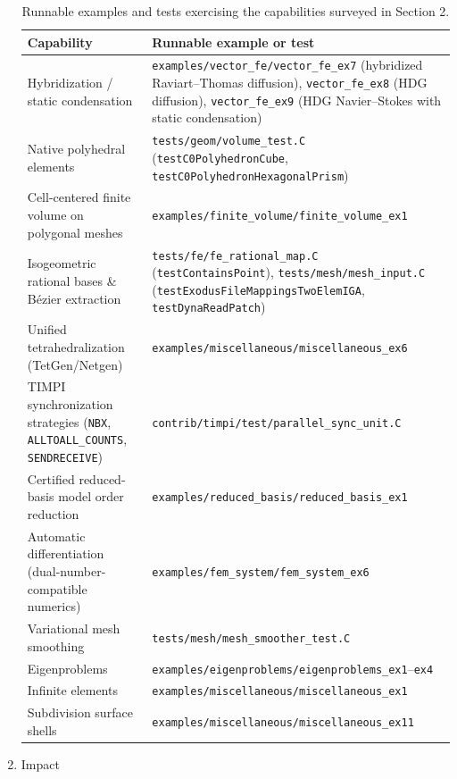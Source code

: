 \documentclass[preprint,12pt, a4paper]{elsarticle}
\begin{document}
\begin{enumerate}
\begin{table}[!h]
\begin{tabular}{|p{4.3cm}|p{8.7cm}|}
\hline
\textbf{Capability} & \textbf{Runnable example or test} \\
\hline
Hybridization / static condensation & \texttt{examples/vector\_fe/vector\_fe\_ex7} (hybridized
Raviart--Thomas diffusion), \texttt{vector\_fe\_ex8} (HDG diffusion), \texttt{vector\_fe\_ex9} (HDG
Navier--Stokes with static condensation) \\
\hline
Native polyhedral elements & \texttt{tests/geom/volume\_test.C}
(\texttt{testC0PolyhedronCube}, \texttt{testC0PolyhedronHexagonalPrism}) \\
\hline
Cell-centered finite volume on polygonal meshes & \texttt{examples/finite\_volume/finite\_volume\_ex1} \\
\hline
Isogeometric rational bases \& B\'ezier extraction & \texttt{tests/fe/fe\_rational\_map.C}
(\texttt{testContainsPoint}), \texttt{tests/mesh/mesh\_input.C}
(\texttt{testExodusFileMappingsTwoElemIGA}, \texttt{testDynaReadPatch}) \\
\hline
Unified tetrahedralization (TetGen/Netgen) & \texttt{examples/miscellaneous/miscellaneous\_ex6} \\
\hline
TIMPI synchronization strategies (\texttt{NBX}, \texttt{ALLTOALL\_COUNTS},
\texttt{SENDRECEIVE}) & \texttt{contrib/timpi/test/parallel\_sync\_unit.C} \\
\hline
Certified reduced-basis model order reduction & \texttt{examples/reduced\_basis/reduced\_basis\_ex1} \\
\hline
Automatic differentiation (dual-number-compatible numerics) & \texttt{examples/fem\_system/fem\_system\_ex6} \\
\hline
Variational mesh smoothing & \texttt{tests/mesh/mesh\_smoother\_test.C} \\
\hline
Eigenproblems & \texttt{examples/eigenproblems/eigenproblems\_ex1}--\texttt{ex4} \\
\hline
Infinite elements & \texttt{examples/miscellaneous/miscellaneous\_ex1} \\
\hline
Subdivision surface shells & \texttt{examples/miscellaneous/miscellaneous\_ex11} \\
\hline
\end{tabular}
\caption{Runnable examples and tests exercising the capabilities surveyed in Section 2.}
\label{tab:examples}
\end{table}

\item Impact


\end{enumerate}
\end{document}
